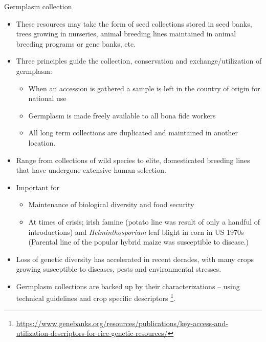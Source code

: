\documentclass[11pt,ignorenonframetext,aspectratio=169]{beamer}
\providecommand{\tightlist}{%
  \setlength{\itemsep}{0pt}\setlength{\parskip}{0pt}}
\begin{document}
\begin{frame}{Germplasm collection}
\protect\hypertarget{germplasm-collection}{}
\footnotesize

\begin{itemize}
\tightlist
\item
  These resources may take the form of seed collections stored in seed
  banks, trees growing in nurseries, animal breeding lines maintained in
  animal breeding programs or gene banks, etc.
\item
  Three principles guide the collection, conservation and
  exchange/utilization of germplasm:

  \begin{itemize}
  \tightlist
  \item
    \footnotesize When an accession is gathered a sample is left in the
    country of origin for national use
  \item
    Germplasm is made freely available to all bona fide workers
  \item
    All long term collections are duplicated and maintained in another
    location.
  \end{itemize}
\item
  Range from collections of wild species to elite, domesticated breeding
  lines that have undergone extensive human selection.
\item
  Important for

  \begin{itemize}
  \tightlist
  \item
    \footnotesize Maintenance of biological diversity and food security
  \item
    At times of crisis; irish famine (potato line was result of only a
    handful of introductions) and \emph{Helminthosporium} leaf blight in
    corn in US 1970s (Parental line of the popular hybrid maize was
    susceptible to disease.)
  \end{itemize}
\item
  Loss of genetic diversity has accelerated in recent decades, with many
  crops growing susceptible to diseases, pests and environmental
  stresses.
\item
  Germplasm collections are backed up by their characterizations --
  using technical guidelines and crop specific descriptors
  \footnote[frame]{\url{https://www.genebanks.org/resources/publications/key-access-and-utilization-descriptors-for-rice-genetic-resources/}}.
\end{itemize}
\end{frame}
\end{document}
